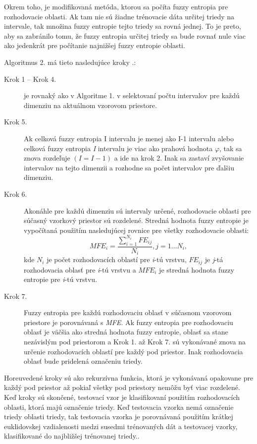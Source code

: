 Okrem toho, je  modifikovaná metóda, ktorou sa počíta fuzzy entropia pre rozhodovacie oblasti. Ak tam nie sú žiadne trénovacie dáta určitej triedy na intervale, tak množina fuzzy entropie tejto triedy sa rovná jednej. To je preto, aby sa zabránilo tomu, že fuzzy entropia určitej triedy sa bude rovnať nule viac ako jedenkrát pre počítanie najnižšej fuzzy entropie oblasti. 


{Algoritmus 2.} má tieto nasledujúce kroky \cite{cheng2006}.: 


\begin{description}
\item[Krok 1 – Krok 4.] je rovnaký ako v Algoritme 1. v selektovaní počtu intervalov pre každú dimenziu na aktuálnom vzorovom priestore. 

\item[Krok 5.] Ak celková fuzzy entropia I intervalu je menej ako I-1 intervalu alebo celková fuzzy entropia \textit{I} intervalu je viac ako prahová hodnota $\varphi$, tak sa znova rozdeľuje $(I = I - 1)$ a ide na krok 2. Inak sa zastaví zvyšovanie intervalov na tejto dimenzii a rozhodne sa počet intervalov pre ďalšiu dimenziu. 
			
\item[Krok 6.] Akonáhle  pre každú dimenziu sú intervaly určené, rozhodovacie oblasti pre súčasný vzorkový priestor sú rozdelené.  Stredná hodnota fuzzy entropie je vypočítaná použitím nasledujúcej rovnice pre všetky rozhodovacie oblasti: 
$$MFE_i =  \frac{\sum\limits_{i=1}^{N_i}FE_{ij}}{ N_i},  j=1 \dots N_i, $$
kde $N_i$ je počet rozhodovacích oblastí pre \textit{i}-tú vrstvu, $FE_{ij}$ je \textit{j}-tá rozhodovacia oblasť pre \textit{i}-tú vrstvu a $MFE_i$ je stredná hodnota fuzzy entropie pre \textit{i}-tú vrstvu. 
				
\item[Krok 7.] Fuzzy entropia pre každú rozhodovaciu oblasť v súčasnom vzorovom priestore je porovnávaná s \textit{MFE}. Ak fuzzy entropia pre rozhodovaciu oblasť je väčšia ako stredná hodnota fuzzy entropie, oblasť sa stane nezávislým pod priestorom a Krok 1. až Krok 7. sú vykonávané znova na určenie rozhodovacích oblastí pre každý pod priestor.  Inak rozhodovacia oblasť bude pridelená označeniu triedy. 

\end{description}

Horeuvedené kroky sú ako rekurzívna funkcia, ktorá je vykonávaná opakovane pre každý pod priestor až pokiaľ všetky pod priestory nemôžu byť viac rozdelené. Keď kroky sú skončené, testovací vzor je klasifikovaní použitím rozhodovacích oblasti, ktorá majú označenie triedy. Keď testovacia vzorka nemá označenie triedy oblasti triedy, tak testovacia vzorka je porovnávaná použitím krátkej euklidovskej vzdialenosti medzi susedmi trénovaných dát a testovacej vzorky, klasifikované do najbližšej trénovanej triedy.\cite{cheng2006}.



